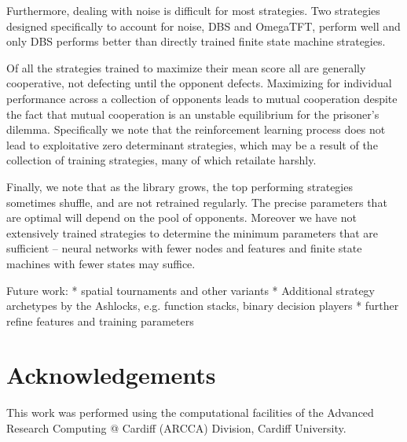 \documentclass{article}
\begin{document}
Furthermore, dealing with noise is difficult for most strategies. Two strategies
designed specifically to account for noise, DBS and OmegaTFT, perform well and
only DBS performs better than directly trained finite state machine strategies.

Of all the strategies trained to maximize their mean score all are generally
cooperative, not defecting until the opponent defects. Maximizing for individual
performance across a collection of opponents leads to mutual cooperation despite
the fact that mutual cooperation is an unstable equilibrium for the prisoner's
dilemma. Specifically we note that the reinforcement learning process does not
lead to exploitative zero determinant strategies, which may be a result of the
collection of training strategies, many of which retailate harshly.

Finally, we note that as the library grows, the top performing strategies
sometimes shuffle, and are not retrained regularly. The precise parameters
that are optimal will depend on the pool of opponents. Moreover we have not
extensively trained strategies to determine the minimum parameters that are
sufficient -- neural networks with fewer nodes and features and finite state
machines with fewer states may suffice.


Future work:
* spatial tournaments and other variants
* Additional strategy archetypes by the Ashlocks, e.g. function stacks, binary
decision players
* further refine features and training parameters


\section*{Acknowledgements}

This work was performed using the computational facilities of the Advanced
Research Computing @ Cardiff (ARCCA) Division, Cardiff University.

\printbibliography
\end{document}
